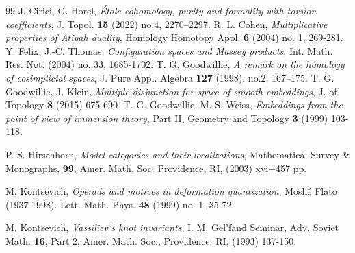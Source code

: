 \documentclass[reqno]{amsart}
\theoremstyle{definition}
\theoremstyle{plain}
\begin{document}
\begin{thebibliography}{99}
 J. Cirici, G.  Horel,
{\em \'{E}tale cohomology, purity and formality with torsion coefficients}, J. Topol.  {\bf 15} (2022) no.4, 2270–2297.
 R. L. Cohen, {\em Multiplicative properties of Atiyah duality}, Homology Homotopy Appl.  {\bf 6}  (2004)  no. 1, 269-281. 
Y. Felix, J.-C. Thomas, {\em Configuration spaces and Massey products}, Int. Math. Res. Not.  (2004)  no. 33, 1685-1702.
 T. G. Goodwillie, {\em 
A remark on the homology of cosimplicial spaces}, J. Pure Appl. Algebra {\bf 127} (1998), no.2, 167–175.
 T. G. Goodwillie, J. Klein, {\em Multiple disjunction for space of smooth embeddings}, J. of
Topology {\bf 8} (2015) 675-690.
 T. G. Goodwillie, M. S. Weiss, {\em Embeddings from the point of view of immersion theory},
Part II, Geometry and Topology {\bf 3} (1999) 103-118.




 P. S. Hirschhorn, {\em Model categories and their localizations}, Mathematical Survey \& Monographs, {\bf 99}, Amer. Math. Soc. Providence, RI, (2003) xvi+457 pp.



M. Kontsevich, {\em Operads and motives in deformation quantization}, Mosh\'e Flato (1937-1998). Lett. Math. Phys. {\bf 48} (1999) no. 1, 35-72. 

M. Kontsevich, {\em Vassiliev's knot invariants}, I. M. Gel'fand Seminar,
Adv. Soviet Math. {\bf 16}, Part 2, Amer. Math. Soc., Providence, RI, (1993) 137-150.


\end{thebibliography}
\end{document}
